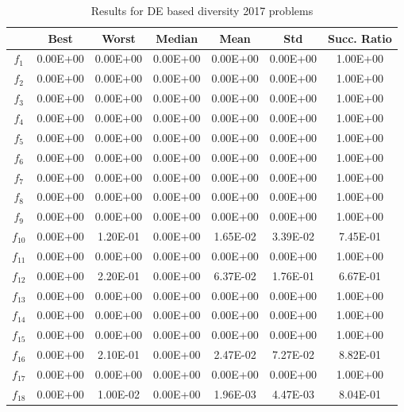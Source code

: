 \begin{table}[t]
\begin{scriptsize}
\centering
\caption{Results for DE based diversity \CEC{} 2017 problems}
\label{tab:Results_CEC2017}
\begin{tabular}{|c|c|c|c|c|c|c|}
\hline
 & \textbf{Best} & \textbf{Worst} & \textbf{Median} & \textbf{Mean} & \textbf{Std} & \textbf{Succ. Ratio} \\ \hline
$f_1$ & 0.00E+00 & 0.00E+00 & 0.00E+00 & 0.00E+00 & 0.00E+00 & 1.00E+00 \\ \hline
$f_2$ & 0.00E+00 & 0.00E+00 & 0.00E+00 & 0.00E+00 & 0.00E+00 & 1.00E+00 \\ \hline
$f_3$ & 0.00E+00 & 0.00E+00 & 0.00E+00 & 0.00E+00 & 0.00E+00 & 1.00E+00 \\ \hline
$f_4$ & 0.00E+00 & 0.00E+00 & 0.00E+00 & 0.00E+00 & 0.00E+00 & 1.00E+00 \\ \hline
$f_5$ & 0.00E+00 & 0.00E+00 & 0.00E+00 & 0.00E+00 & 0.00E+00 & 1.00E+00 \\ \hline
$f_6$ & 0.00E+00 & 0.00E+00 & 0.00E+00 & 0.00E+00 & 0.00E+00 & 1.00E+00 \\ \hline
$f_7$ & 0.00E+00 & 0.00E+00 & 0.00E+00 & 0.00E+00 & 0.00E+00 & 1.00E+00 \\ \hline
$f_8$ & 0.00E+00 & 0.00E+00 & 0.00E+00 & 0.00E+00 & 0.00E+00 & 1.00E+00 \\ \hline
$f_9$ & 0.00E+00 & 0.00E+00 & 0.00E+00 & 0.00E+00 & 0.00E+00 & 1.00E+00 \\ \hline
$f_{10}$ & 0.00E+00 & 1.20E-01 & 0.00E+00 & 1.65E-02 & 3.39E-02 & 7.45E-01 \\ \hline
$f_{11}$ & 0.00E+00 & 0.00E+00 & 0.00E+00 & 0.00E+00 & 0.00E+00 & 1.00E+00 \\ \hline
$f_{12}$ & 0.00E+00 & 2.20E-01 & 0.00E+00 & 6.37E-02 & 1.76E-01 & 6.67E-01 \\ \hline
$f_{13}$ & 0.00E+00 & 0.00E+00 & 0.00E+00 & 0.00E+00 & 0.00E+00 & 1.00E+00 \\ \hline
$f_{14}$ & 0.00E+00 & 0.00E+00 & 0.00E+00 & 0.00E+00 & 0.00E+00 & 1.00E+00 \\ \hline
$f_{15}$ & 0.00E+00 & 0.00E+00 & 0.00E+00 & 0.00E+00 & 0.00E+00 & 1.00E+00 \\ \hline
$f_{16}$ & 0.00E+00 & 2.10E-01 & 0.00E+00 & 2.47E-02 & 7.27E-02 & 8.82E-01 \\ \hline
$f_{17}$ & 0.00E+00 & 0.00E+00 & 0.00E+00 & 0.00E+00 & 0.00E+00 & 1.00E+00 \\ \hline
$f_{18}$ & 0.00E+00 & 1.00E-02 & 0.00E+00 & 1.96E-03 & 4.47E-03 & 8.04E-01 \\ \hline

\end{tabular}
\end{scriptsize}
\end{table}
